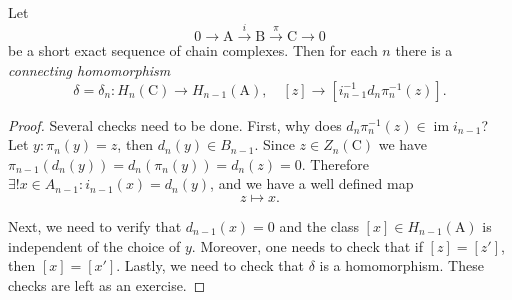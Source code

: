 \documentclass[english,letterpaper]{article}%
\numberwithin{equation}{section}
\numberwithin{figure}{section}
\numberwithin{table}{section}
\theoremstyle{definition}
\theoremstyle{definition}
\theoremstyle{definition}
\theoremstyle{plain}
\theoremstyle{plain}
\theoremstyle{plain}
\theoremstyle{plain}
\theoremstyle{remark}
\theoremstyle{remark}
\newcommand{\bm}[1]{\boldsymbol{\mathrm{#1}}}
\DeclareMathOperator{\im}{im}
\begin{document}
\begin{thm}\label{connecting hom in homology}
    Let 
    \[0\to \bm{A}\overset i\to \bm{B}\overset\pi\to \bm{C}\to 0 \]
    be a short exact sequence of chain complexes. Then for each $n$ there is a \emph{connecting homomorphism}
    \[\delta=\delta_n:H_n(\bm{C})\to H_{n-1}(\bm{A}),\quad [z]\to \left[i_{n-1}^{-1} d_n\pi_n^{-1}(z)\right].\]
\end{thm}
\begin{proof}
    Several checks need to be done. First, why does $d_n\pi_n^{-1}(z)\in\im i_{n-1}$? Let $y:\pi_n(y)=z$, then $d_n(y)\in B_{n-1}$. Since $z\in Z_n(\bm{C})$ we have $\pi_{n-1}(d_n(y))=d_n(\pi_n(y))=d_n(z)=0$. Therefore $\exists ! x\in A_{n-1}:i_{n-1}(x)=d_n(y)$, and we have a well defined map
    \[z\mapsto x.\]
    
    Next, we need to verify that $d_{n-1}(x)=0$ and the class $[x]\in H_{n-1}(\bm{A})$ is independent of the choice of $y$.
    Moreover, one needs to check that if $[z]=[z']$, then $[x]=[x']$. Lastly, we need to check that $\delta$ is a homomorphism. These checks are left as an exercise.
\end{proof}
\end{document}
